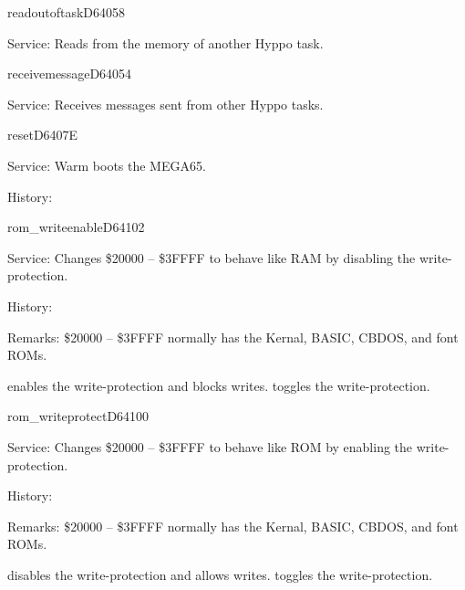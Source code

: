 \begin{hyppotrap}{readoutoftask}{D640}{58}
\item [Service:]
  Reads from the memory of another Hyppo task.
\notimplemented
\end{hyppotrap}


\begin{hyppotrap}{receivemessage}{D640}{54}
\item [Service:]
  Receives messages sent from other Hyppo tasks.
\notimplemented
\end{hyppotrap}


\newpage
\begin{hyppotrap}{reset}{D640}{7E}
\item [Service:]
  Warm boots the MEGA65.
\item [History:]
\end{hyppotrap}


\newpage
\begin{hyppotrap}{rom\_writeenable}{D641}{02}
\item [Service:]
  Changes \$20000 -- \$3FFFF to behave like RAM by disabling the
  write-protection.
\item [History:]
\item [Remarks:]
  \$20000 -- \$3FFFF normally has the Kernal, BASIC, CBDOS, and font ROMs.

   enables the write-protection and blocks writes.
   toggles the write-protection.
\end{hyppotrap}


\newpage
\begin{hyppotrap}{rom\_writeprotect}{D641}{00}
\item [Service:]
  Changes \$20000 -- \$3FFFF to behave like ROM by enabling the
  write-protection.
\item [History:]
\item [Remarks:]
  \$20000 -- \$3FFFF normally has the Kernal, BASIC, CBDOS, and font ROMs.

   disables the write-protection and allows writes.
   toggles the write-protection.
\end{hyppotrap}


